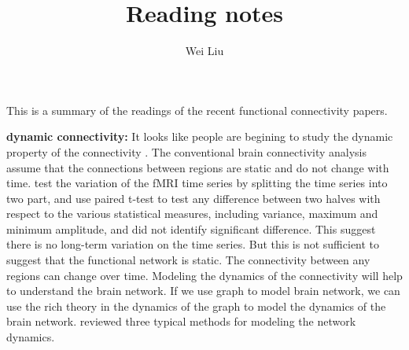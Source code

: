\documentclass[12pt]{article}
\begin{document}
\title{Reading notes}
\author{Wei Liu}
\maketitle

This is a summary of the readings of the recent functional connectivity papers. 

\textbf{dynamic connectivity: } It looks like people are begining to study the
dynamic property of the connectivity \citep{deco2010emerging}. The conventional
brain connectivity analysis assume that the connections between regions are
static and do not change with time. \cite{zalesky2011relationship} test the
variation of the fMRI time series by splitting the time series into two part,
and use paired t-test to test any difference between two halves with respect to
the various statistical measures, including variance, maximum and minimum
amplitude, and did not identify significant difference. This suggest there is no
long-term variation on the time series. But this is not sufficient to suggest
that the functional network is static. The connectivity between any regions can
change over time. Modeling the dynamics of the connectivity will help to
understand the brain network. If we use graph to model brain network, we can use
the rich theory in the dynamics of the graph \citep{mortveit2008introduction} to
model the dynamics of the brain network. \cite{deco2010emerging} reviewed three
typical methods for modeling the network dynamics.
\end{document}
